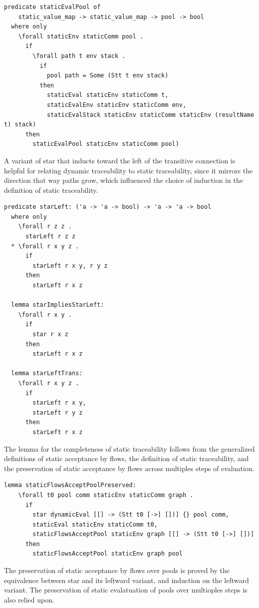 \documentclass[letterpaper, 11pt]{extarticle}
\begin{document}
\begin{lstlisting}[language=logic, mathescape]
  predicate staticEvalPool of
    static_value_map -> static_value_map -> pool -> bool
  where only
    \forall staticEnv staticComm pool .
      if
        \forall path t env stack .
          if
            pool path = Some (Stt t env stack)
          then 
            staticEval staticEnv staticComm t,
            staticEvalEnv staticEnv staticComm env,
            staticEvalStack staticEnv staticComm staticEnv (resultName t) stack)
      then 
        staticEvalPool staticEnv staticComm pool)
  \end{lstlisting}


A variant of star that inducts toward the left of the transitive connection is helpful for
relating dynamic traceability to static traceability, since it mirrors the direction that way
paths grow, which influenced the choice of induction in the definition of static
traceability.

\begin{lstlisting}[language=logic, mathescape]
  predicate starLeft: ('a -> 'a -> bool) -> 'a -> 'a -> bool
  where only
    \forall r z z .
      starLeft r z z
  * \forall r x y z .
      if
        starLeft r x y, r y z
      then
        starLeft r x z

  lemma starImpliesStarLeft:
    \forall r x y .
      if
        star r x z
      then
        starLeft r x z

  lemma starLeftTrans:
    \forall r x y z .
      if 
        starLeft r x y,
        starLeft r y z 
      then
        starLeft r x z
\end{lstlisting}

The lemma for the completeness of static traceability follows from the generalized definitions
of static acceptance by flows, the definition of static traceability, and the preservation
of static acceptance by flows across multiples steps of evaluation.

\begin{lstlisting}[language=logic, mathescape]
  lemma staticFlowsAcceptPoolPreserved:
    \forall t0 pool comm staticEnv staticComm graph .
      if
        star dynamicEval [[] -> (Stt t0 [->] [])] {} pool comm, 
        staticEval staticEnv staticComm t0,
        staticFlowsAcceptPool staticEnv graph [[] -> (Stt t0 [->] [])]
      then
        staticFlowsAcceptPool staticEnv graph pool 
\end{lstlisting}

The preservation of static acceptance by flows over pools is proved by the
equivalence between star and its leftward variant, and induction on the leftward variant.
The preservation of static evalatuation of pools over multioples steps is also relied upon.
\end{document}
